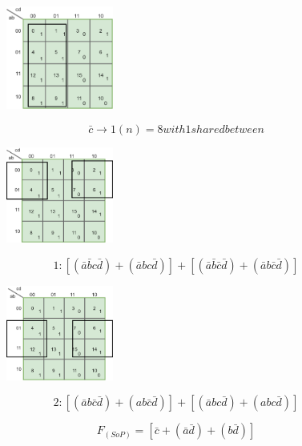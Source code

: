\documentclass[20pt, a4paper]{article}
\begin{document}
\begin{figure}[htbp]\centering
	\centerline{\includegraphics[width=100pt]{img/karnoughMap/p1.png}}
\end{figure}


\begin{equation}
	\bar{c} \rightarrow 1(n)=8 with 1 shared between 
\end{equation}

\begin{figure}[htbp]\centering
	\centerline{\includegraphics[width=100pt]{img/karnoughMap/p2.png}}
\end{figure}

\begin{equation}
	1: [(\bar{a}\bar{b}c\bar{d}) + (\bar{a}bc\bar{d})] + [(\bar{a}\bar{b}\bar{c}\bar{d})+(\bar{a}b\bar{c}\bar{d})]
\end{equation}

\begin{figure}[htbp]\centering
	\centerline{\includegraphics[width=100pt]{img/karnoughMap/p3.png}}
\end{figure}


\begin{equation}
	2: [(\bar{a}b\bar{c}\bar{d})+(ab\bar{c}\bar{d})] + [(\bar{a}bc\bar{d}) + (abc\bar{d})] 
\end{equation}


\begin{equation}
	F_{(SoP)} =  [\bar{c}+(\bar{a}\bar{d})+(b\bar{d})]
\end{equation}
\end{document}
